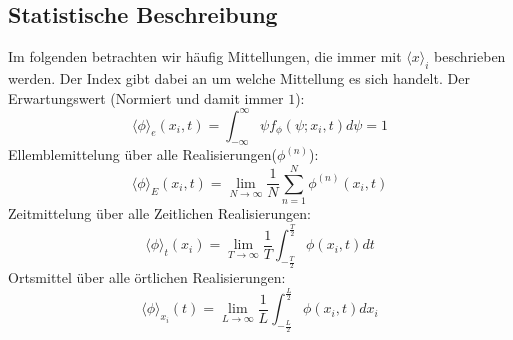 \subsection{Statistische Beschreibung}
Im folgenden betrachten wir häufig Mittellungen, die immer mit $\langle x \rangle_{i}$ beschrieben werden. Der Index gibt dabei an um welche Mittellung es sich handelt. 
Der Erwartungswert (Normiert und damit immer $1$):
\begin{equation}
	\langle\phi\rangle_{e}\left(x_{i}, t\right)=\int_{-\infty}^{\infty} \psi f_{\phi}\left(\psi ; x_{i}, t\right) d \psi = 1
\end{equation}
Ellemblemittelung über alle Realisierungen($\phi^{(n)}$):
\begin{equation}
	\langle\phi\rangle_{E}\left(x_{i}, t\right)=\lim _{N \rightarrow \infty} \frac{1}{N} \sum_{n=1}^{N} \phi^{(n)}\left(x_{i}, t\right)
\end{equation}
Zeitmittelung über alle Zeitlichen Realisierungen:
\begin{equation}
	\langle\phi\rangle_{t}\left(x_{i}\right)=\lim _{T \rightarrow \infty} \frac{1}{T} \int^{\frac{T}{2}}_{-\frac{T}{2}} \phi\left(x_{i}, t\right) d t
\end{equation}
Ortsmittel über alle örtlichen Realisierungen:
\begin{equation}
	\langle\phi\rangle_{x_{i}}(t)=\lim _{L \rightarrow \infty} \frac{1}{L} \int_{-\frac{L}{2}}^{\frac{L}{2}} \phi\left(x_{i}, t\right) d x_{i}
\end{equation}